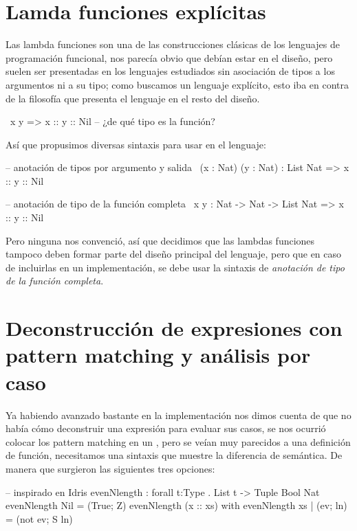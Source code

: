 {\section{Lamda funciones explícitas}

\begin{designfr}
Las lambda funciones son una de las construcciones clásicas de los lenguajes de programación funcional, nos parecía obvio que debían estar en el diseño, pero suelen ser presentadas en los lenguajes estudiados sin asociación de tipos a los argumentos ni a su tipo; como buscamos un lenguaje explícito, esto iba en contra de la filosofía que presenta el lenguaje en el resto del diseño.

\begin{anglercode}
\ x y => x :: y :: Nil      -- ¿de qué tipo es la función?
\end{anglercode}

Así que propusimos diversas sintaxis para usar en el lenguaje:

\begin{anglercode}
-- anotación de tipos por argumento y salida
\ (x : Nat) (y : Nat) : List Nat => x :: y :: Nil

-- anotación de tipo de la función completa
\ x y : Nat -> Nat -> List Nat => x :: y :: Nil
\end{anglercode}

Pero ninguna nos convenció, así que decidimos que las lambdas funciones tampoco deben formar parte del diseño principal del lenguaje, pero que en caso de incluirlas en un implementación, se debe usar la sintaxis de \emph{anotación de tipo de la función completa}.
\end{designfr}

\section{Deconstrucción de expresiones con pattern matching y análisis por caso}
\label{case-of}

\begin{designfr}
Ya habiendo avanzado bastante en la implementación nos dimos cuenta de que no había cómo deconstruir una expresión para evaluar sus casos, se nos ocurrió colocar los pattern matching en un , pero se veían muy parecidos a una definición de función, necesitamos una sintaxis que muestre la diferencia de semántica. De manera que surgieron las siguientes tres opciones:

\begin{anglercode}[morekeywords={pattern}]
-- inspirado en Idris
evenNlength : forall t:Type . List t -> Tuple Bool Nat
evenNlength Nil = (True; Z)
evenNlength (x :: xs)
    with evenNlength xs
        | (ev; ln) = (not ev; S ln)


\end{anglercode}
\end{designfr}}
